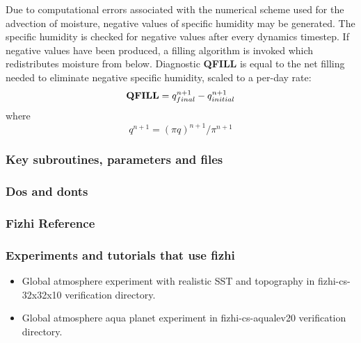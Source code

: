 \noindent
Due to computational errors associated with the numerical scheme used for
the advection of moisture, negative values of specific humidity may be generated.  The
specific humidity is checked for negative values after every dynamics timestep.  If negative
values have been produced, a filling algorithm is invoked which redistributes moisture from
below.  Diagnostic {\bf QFILL} is equal to the net filling needed
to eliminate negative specific humidity, scaled to a per-day rate:
\[
{\bf QFILL} = q^{n+1}_{final} - q^{n+1}_{initial}
\]
where
\[
q^{n+1} = (\pi q)^{n+1} / \pi^{n+1}
\]


\subsubsection{Key subroutines, parameters and files}

\subsubsection{Dos and donts}

\subsubsection{Fizhi Reference}

\subsubsection{Experiments and tutorials that use fizhi}
\label{sec:pkg:fizhi:experiments}

\begin{itemize}
\item{Global atmosphere experiment with realistic SST and topography in fizhi-cs-32x32x10 verification directory. }
\item{Global atmosphere aqua planet experiment in fizhi-cs-aqualev20 verification directory. }
\end{itemize}

